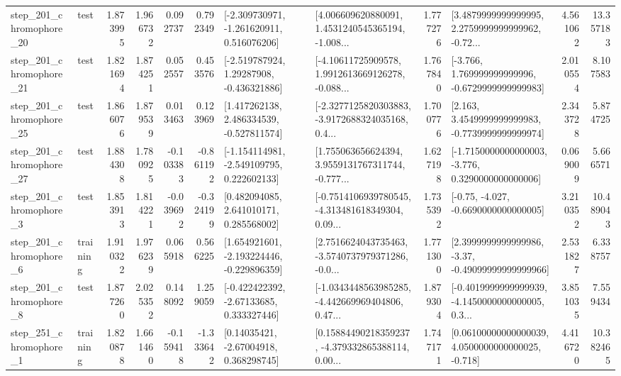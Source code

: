 \begin{tabular}{llrrrrllrlrr}
  step\_201\_chromophore\_20 &      test &      1.873995 &    1.966732 &      0.092737 &  0.792349 &   [-2.309730971, -1.261620911, 0.516076206] &  [4.006609620880091, 1.4531240545365194, -1.008... &       1.777276 &  [3.4879999999999995, 2.2759999999999962, -0.72... &            4.561062 &         13.357183 \\
  step\_201\_chromophore\_21 &      test &      1.821694 &    1.874251 &      0.052557 &  0.453576 &    [-2.519787924, 1.29287908, -0.436321886] &  [-4.10611725909578, 1.9912613669126278, -0.088... &       1.767840 &   [-3.766, 1.769999999999996, -0.6729999999999983] &            2.010554 &          8.107583 \\
  step\_201\_chromophore\_25 &      test &      1.866076 &    1.879539 &      0.013463 &  0.123969 &    [1.417262138, 2.486334539, -0.527811574] &  [-2.3277125820303883, -3.9172688324035168, 0.4... &       1.700776 &   [2.163, 3.4549999999999983, -0.7739999999999974] &            2.343728 &          5.874725 \\
  step\_201\_chromophore\_27 &      test &      1.884308 &    1.780925 &     -0.103383 & -0.861192 &   [-1.154114981, -2.549109795, 0.222602133] &  [1.755063656624394, 3.9559131767311744, -0.777... &       1.627198 &  [-1.7150000000000003, -3.776, 0.3290000000000006] &            0.069009 &          5.666571 \\
   step\_201\_chromophore\_3 &      test &      1.853913 &    1.814221 &     -0.039692 & -0.324199 &     [0.482094085, 2.641010171, 0.285568002] &  [-0.7514106939780545, -4.313481618349304, 0.09... &       1.735392 &               [-0.75, -4.027, -0.6690000000000005] &            3.210352 &         10.489043 \\
   step\_201\_chromophore\_6 &  training &      1.910322 &    1.976239 &      0.065918 &  0.566225 &   [1.654921601, -2.193224446, -0.229896359] &  [2.7516624043735463, -3.5740737979371286, -0.0... &       1.771300 &  [2.3999999999999986, -3.37, -0.49099999999999966] &            2.531827 &          6.338757 \\
   step\_201\_chromophore\_8 &      test &      1.877260 &    2.025352 &      0.148092 &  1.259059 &    [-0.422422392, -2.67133685, 0.333327446] &  [-1.0343448563985285, -4.442669969404806, 0.47... &       1.879304 &  [-0.4019999999999939, -4.1450000000000005, 0.3... &            3.851035 &          7.559434 \\
   step\_251\_chromophore\_1 &  training &      1.820878 &    1.661460 &     -0.159418 & -1.333642 &      [0.14035421, -2.67004918, 0.368298745] &  [0.15884490218359237, -4.379332865388114, 0.00... &       1.747171 &  [0.06100000000000039, 4.0500000000000025, -0.718] &            4.416720 &         10.382465 \\

\end{tabular}
